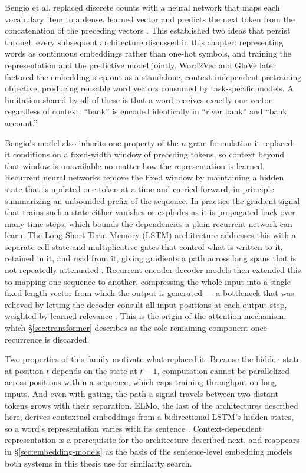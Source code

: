 Bengio et al. replaced discrete counts with a neural network that maps each vocabulary item to a dense, learned vector and predicts the next token from the concatenation of the preceding vectors \citep{bengio2003neural}. This established two ideas that persist through every subsequent architecture discussed in this chapter: representing words as continuous embeddings rather than one-hot symbols, and training the representation and the predictive model jointly. Word2Vec \citep{mikolov2013distributed} and GloVe \citep{pennington2014glove} later factored the embedding step out as a standalone, context-independent pretraining objective, producing reusable word vectors consumed by task-specific models. A limitation shared by all of these is that a word receives exactly one vector regardless of context: ``bank'' is encoded identically in ``river bank'' and ``bank account.''

Bengio's model also inherits one property of the $n$-gram formulation it replaced: it conditions on a fixed-width window of preceding tokens, so context beyond that window is unavailable no matter how the representation is learned. Recurrent neural networks remove the fixed window by maintaining a hidden state that is updated one token at a time and carried forward, in principle summarizing an unbounded prefix of the sequence. In practice the gradient signal that trains such a state either vanishes or explodes as it is propagated back over many time steps, which bounds the dependencies a plain recurrent network can learn. The Long Short-Term Memory (LSTM) architecture addresses this with a separate cell state and multiplicative gates that control what is written to it, retained in it, and read from it, giving gradients a path across long spans that is not repeatedly attenuated . Recurrent encoder-decoder models then extended this to mapping one sequence to another, compressing the whole input into a single fixed-length vector from which the output is generated  --- a bottleneck that was relieved by letting the decoder consult all input positions at each output step, weighted by learned relevance . This is the origin of the attention mechanism, which \S\ref{sec:transformer} describes as the sole remaining component once recurrence is discarded.

Two properties of this family motivate what replaced it. Because the hidden state at position $t$ depends on the state at $t-1$, computation cannot be parallelized across positions within a sequence, which caps training throughput on long inputs. And even with gating, the path a signal travels between two distant tokens grows with their separation. ELMo, the last of the architectures described here, derives contextual embeddings from a bidirectional LSTM's hidden states, so a word's representation varies with its sentence \citep{peters2018deep}. Context-dependent representation is a prerequisite for the architecture described next, and reappears in \S\ref{sec:embedding-models} as the basis of the sentence-level embedding models both systems in this thesis use for similarity search.


